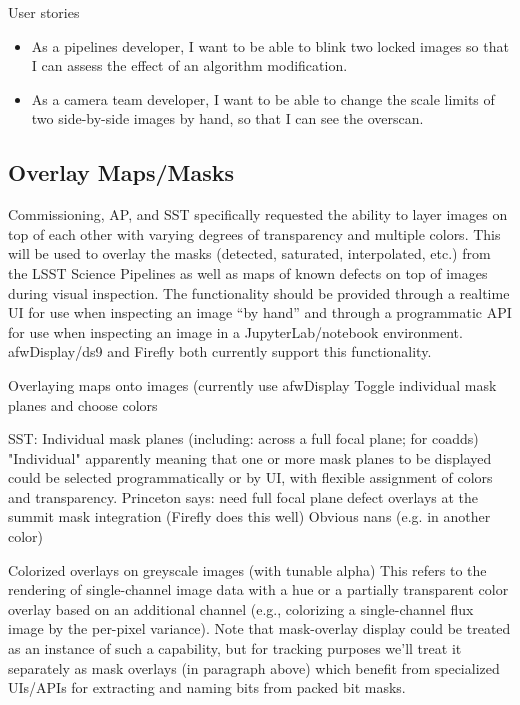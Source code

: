 User stories
\begin{itemize}
\item{As a pipelines developer,  I want to be able to blink two locked images so that I can assess the effect of an algorithm modification.}
\item{As a camera team developer,  I want to be able to change the scale limits of two side-by-side images by hand, so that I can see the overscan.}
\end{itemize}


\subsection{Overlay Maps/Masks}

Commissioning, AP, and SST specifically requested the ability to layer images on
top of each other with varying degrees of transparency and multiple colors.
This will be used to overlay the masks (detected, saturated, interpolated, etc.)
from the LSST Science Pipelines as well as maps of known defects on top of
images during visual inspection.  The functionality should be provided through
a realtime UI for use when inspecting an image ``by hand'' and through a
programmatic API for use when inspecting an image in a JupyterLab/notebook
environment.  afwDisplay/ds9 and Firefly both currently support this
functionality.

Overlaying maps onto images (currently use afwDisplay
Toggle individual mask planes and choose colors

SST: Individual mask planes (including: across a full focal plane; for coadds)
"Individual" apparently meaning that one or more mask planes to be displayed could be selected programmatically or by UI, with flexible assignment of colors and transparency.
Princeton says: need full focal plane defect overlays at the summit
mask integration (Firefly does this well)
Obvious nans (e.g. in another color)

Colorized overlays on greyscale images (with tunable alpha)
This refers to the rendering of single-channel image data with a hue or a partially transparent color overlay based on an additional channel (e.g., colorizing a single-channel flux image by the per-pixel variance). Note that mask-overlay display could be treated as an instance of such a capability, but for tracking purposes we'll treat it separately as mask overlays (in paragraph above) which benefit from specialized UIs/APIs for extracting and naming bits from packed bit masks.


